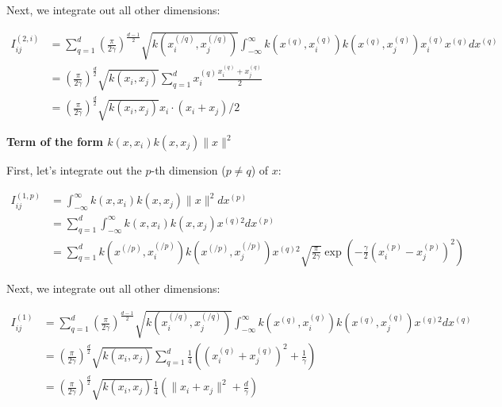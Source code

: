 \documentclass[12pt]{article}
\begin{document}
Next, we integrate out all other dimensions:

\begin{align}
I_{ij}^{(2,i)} &= \sum_{q=1}^d   \left(\frac{\pi}{2 \gamma}\right)^{\frac{d-1}{2}} \sqrt{k(x_i^{(/q)},x_j^{(/q)})} \int_{-\infty}^{\infty} k\left(x^{(q)}, x_i^{(q)}\right) k\left(x^{(q)}, x_j^{(q)}\right) x_{i}^{(q)} x^{(q)} dx^{(q)}\\
&=   \left(\frac{\pi}{2 \gamma}\right)^{\frac{d}{2}} \sqrt{k(x_i,x_j)} \sum_{q=1}^d x_i^{(q)} \frac{x_i^{(q)}+ x_j^{(q)}}{2} \\
&=   \left(\frac{\pi}{2 \gamma}\right)^{\frac{d}{2}} \sqrt{k(x_i,x_j)}  x_i \cdot (x_i + x_j) / 2 
\end{align}

\textbf{Term of the form $k(x,x_i)k(x,x_j)\|x\|^2$}

First, let's integrate out the $p$-th dimension ($p \ne q$) of $x$:

\begin{align}
I^{(1,p)}_{ij} &= \int_{-\infty}^\infty k(x,x_i)k(x,x_j) \|x\|^2 dx^{(p)}\\
&= \sum_{q=1}^d\int_{-\infty}^\infty k(x,x_i)k(x,x_j)x^{(q)2} dx^{(p)}\\
&= \sum_{q=1}^d  k(x^{(/p)}, x_i^{(/p)}) k(x^{(/p)}, x_j^{(/p)}) x^{(q)2} \sqrt{\frac{\pi}{2 \gamma}} \exp\left(- 
\frac{\gamma}{2}\left(x_i^{(p)} - x_j^{(p)}\right)^2\right)
\end{align}

Next, we integrate out all other dimensions:

\begin{align}
I_{ij}^{(1)} &= \sum_{q=1}^d   \left(\frac{\pi}{2 \gamma}\right)^{\frac{d-1}{2}} \sqrt{k(x_i^{(/q)},x_j^{(/q)})} \int_{-\infty}^{\infty} k\left(x^{(q)}, x_i^{(q)}\right) k\left(x^{(q)}, x_j^{(q)}\right) x^{(q)2} dx^{(q)}\\
&=   \left(\frac{\pi}{2 \gamma}\right)^{\frac{d}{2}} \sqrt{k(x_i,x_j)} \sum_{q=1}^d \frac{1}{4}\left((x_i^{(q)}+  x_j^{(q)})^2 + \frac{1}{\gamma}\right) \\
&=   \left(\frac{\pi}{2 \gamma}\right)^{\frac{d}{2}} \sqrt{k(x_i,x_j)}  \frac{1}{4} \left(\|x_i + x_j\|^2 + \frac{d}{\gamma}\right)
\end{align}

\end{document}
